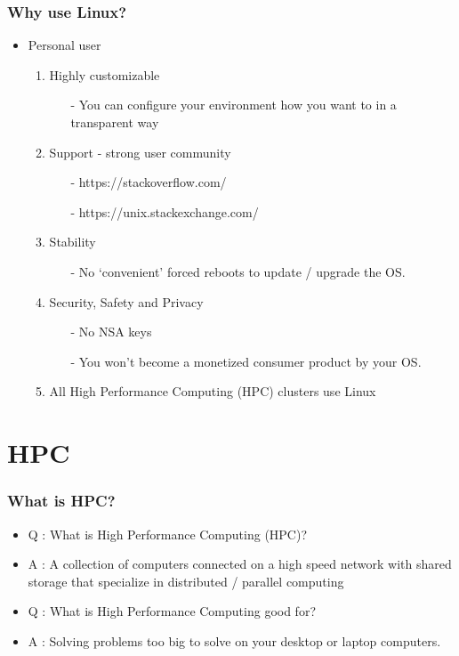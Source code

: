 \documentclass{beamer}
\begin{document}
\begin{frame}
\frametitle{Why use Linux?}
\begin{itemize}
    \item Personal user
    \begin{enumerate}
        \pause
        \item Highly customizable
        \begin{itemize}
            \pause
            \item[-] You can configure your environment how you want to in a transparent way
        \end{itemize}
        \pause
        \item Support - strong user community
        \begin{itemize}
            \item[-] https://stackoverflow.com/
            \pause
            \item[-] https://unix.stackexchange.com/
        \end{itemize}
        \pause
        \item Stability
        \begin{itemize}
            \pause
            \item[-] No `convenient' forced reboots to update / upgrade the OS.
        \end{itemize}
        \pause
        \item Security, Safety and Privacy
        \begin{itemize}
            \pause
            \item[-] No NSA keys
            \pause
            \item[-] You won't become a monetized consumer product by your OS.
        \end{itemize}
        \pause
        \item All High Performance Computing (HPC) clusters use Linux
    \end{enumerate}
\end{itemize}
\end{frame}




\section{HPC}

\begin{frame}
\frametitle{What is HPC?}
\begin{itemize}
    \item Q : What is High Performance Computing (HPC)?
    \pause
    \item A : A collection of computers connected on a high speed network with
              shared storage that specialize in distributed / parallel computing
    \pause
    \bigskip
    \item Q : What is High Performance Computing good for?
    \pause
    \item A : Solving problems too big to solve on your desktop or laptop computers.
    \bigskip
\end{itemize}
\end{frame}
\end{document}
